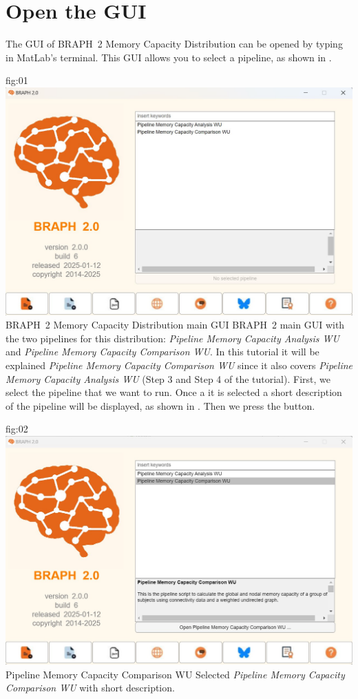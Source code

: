 \documentclass[justified]{tufte-handout}
\begin{document}
\section{Open the GUI}

The GUI of BRAPH~2 Memory Capacity Distribution can be opened by typing  in MatLab's terminal. This GUI allows you to select a pipeline, as shown in .

{fig:01}
{
	\includegraphics{fig01.jpg}
}
{BRAPH~2 Memory Capacity Distribution main GUI}
{
	BRAPH~2 main GUI with the two pipelines for this distribution: \emph{Pipeline Memory Capacity Analysis WU} and \emph{Pipeline Memory Capacity Comparison WU}.
}
In this tutorial it will be explained \emph{Pipeline Memory Capacity Comparison WU} since it also covers \emph{Pipeline Memory Capacity Analysis WU} (Step 3 and Step 4 of the tutorial). First, we select the pipeline that we want to run. Once a it is selected a short description of the pipeline will be displayed, as shown in . Then we press the  button.

{fig:02}
{
	\includegraphics{fig02.jpg}
}
{Pipeline Memory Capacity Comparison WU}
{
	Selected \emph{Pipeline Memory Capacity Comparison WU} with short description.
}
\end{document}
